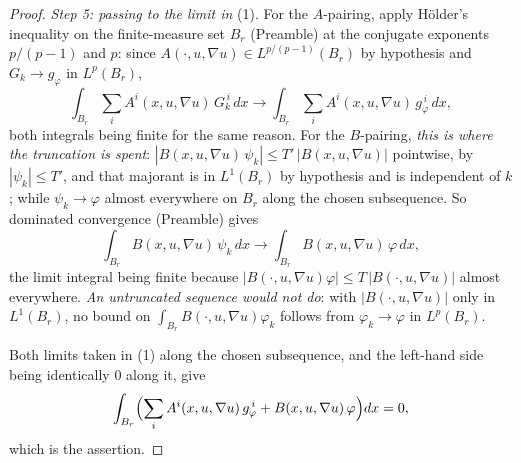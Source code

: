 \begin{proof}
\emph{Step 5: passing to the limit in} (1).  For the $A$-pairing, apply
H\"older's inequality on the finite-measure set $B_r$ (Preamble) at the
conjugate exponents $p/(p-1)$ and $p$: since
$A(\cdot,u,\nabla u)\in L^{p/(p-1)}(B_r)$ by hypothesis and
$G_k\to g_\varphi$ in $L^p(B_r)$,
\[
\int_{B_r}\sum_iA^i(x,u,\nabla u)\,G_k^{\,i}\,dx
\longrightarrow\int_{B_r}\sum_iA^i(x,u,\nabla u)\,g_\varphi^{\,i}\,dx ,
\]
both integrals being finite for the same reason.  For the $B$-pairing,
\emph{this is where the truncation is spent}:
$|B(x,u,\nabla u)\,\psi_k|\le T'\,|B(x,u,\nabla u)|$ pointwise, by
$|\psi_k|\le T'$, and that majorant is in $L^1(B_r)$ by hypothesis and is
independent of $k$; while $\psi_k\to\varphi$ almost everywhere on $B_r$ along
the chosen subsequence.  So dominated convergence (Preamble) gives
\[
\int_{B_r}B(x,u,\nabla u)\,\psi_k\,dx
\longrightarrow\int_{B_r}B(x,u,\nabla u)\,\varphi\,dx ,
\]
the limit integral being finite because $|B(\cdot,u,\nabla u)\varphi|\le
T\,|B(\cdot,u,\nabla u)|$ almost everywhere.  \emph{An untruncated sequence
would not do}: with $|B(\cdot,u,\nabla u)|$ only in $L^1(B_r)$, no bound on
$\int_{B_r}B(\cdot,u,\nabla u)\varphi_k$ follows from $\varphi_k\to\varphi$ in
$L^p(B_r)$.

Both limits taken in (1) along the chosen subsequence, and the left-hand side
being identically $0$ along it, give
\[
\int_{B_r}\Bigl(\sum_iA^i(x,u,\nabla u)\,g_\varphi^{\,i}
+B(x,u,\nabla u)\,\varphi\Bigr)dx=0 ,
\]
which is the assertion.
\end{proof}
